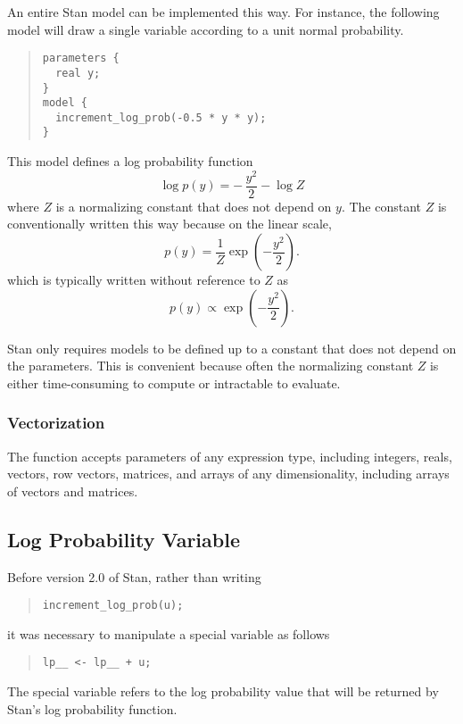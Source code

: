An entire Stan model can be implemented this way.  For instance, the
following model will draw a single variable according to a unit normal
probability.  
%
\begin{quote}
\begin{Verbatim}
parameters {
  real y;
}
model {
  increment_log_prob(-0.5 * y * y);
}
\end{Verbatim}
\end{quote}
%
This model defines a log probability function 
%
\[
\log p(y) = - \, \frac{y^2}{2} - \log Z
\]
%
where $Z$ is a normalizing constant that does not depend on $y$.  The
constant $Z$ is conventionally written this way because on the linear
scale,
\[
p(y) = \frac{1}{Z} \exp\left(-\frac{y^2}{2}\right).
\]
which is typically written without reference to $Z$ as
\[
p(y) \propto \exp\left(-\frac{y^2}{2}\right).
\]

Stan only requires models to be defined up to a constant that does not
depend on the parameters.  This is convenient because often the
normalizing constant $Z$ is either time-consuming to compute or
intractable to evaluate.

\subsubsection{Vectorization}

The  function accepts parameters of any
expression type, including integers, reals, vectors, row vectors,
matrices, and arrays of any dimensionality, including arrays of
vectors and matrices.

\subsection{Log Probability Variable }

Before version 2.0 of Stan, rather than writing
%
\begin{quote}
\begin{Verbatim}
increment_log_prob(u);
\end{Verbatim}
\end{quote}
%
it was necessary to manipulate a special variable 
as follows
%
\begin{quote}
\begin{Verbatim}
lp__ <- lp__ + u;
\end{Verbatim}
\end{quote}
%
The special variable  refers to the log probability value
that will be returned by Stan's log probability function.  

